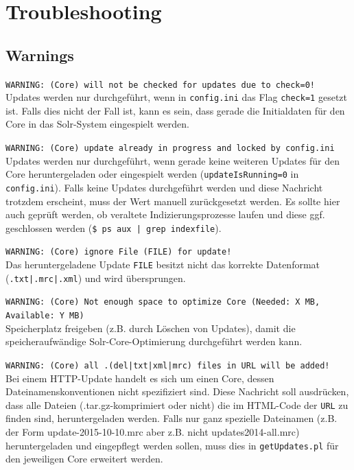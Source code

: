 \documentclass[10pt]{article}
\begin{document}
\newpage
\section{Troubleshooting}
\subsection{Warnings}
\texttt{WARNING: (Core) will not be checked for updates due to check=0!}\\
Updates werden nur durchgeführt, wenn in \texttt{config.ini} das Flag \texttt{check=1} gesetzt ist. Falls dies nicht der Fall ist, kann es sein, dass gerade die Initialdaten für den Core in das Solr-System eingespielt werden. 

\texttt{WARNING: (Core) update already in progress and locked by config.ini}\\
Updates werden nur durchgeführt, wenn gerade keine weiteren Updates für den Core heruntergeladen oder eingespielt werden (\texttt{updateIsRunning=0} in \texttt{config.ini}). Falls keine Updates durchgeführt werden und diese Nachricht trotzdem erscheint, muss der Wert manuell zurückgesetzt werden. Es sollte hier auch geprüft werden, ob veraltete Indizierungsprozesse laufen und diese ggf. geschlossen werden (\texttt{\$ ps aux | grep indexfile}).

\texttt{WARNING: (Core) ignore File (FILE) for update!}\\
Das heruntergeladene Update \texttt{FILE} besitzt nicht das korrekte Datenformat (\texttt{.txt|.mrc|.xml}) und wird übersprungen.
 
\texttt{WARNING: (Core) Not enough space to optimize Core (Needed: X MB, Available: Y MB)} \\
Speicherplatz freigeben (z.B. durch Löschen von Updates), damit die speicheraufwändige Solr-Core-Optimierung durchgeführt werden kann.

\texttt{WARNING: (Core) all .(del|txt|xml|mrc) files in URL will be added!} \\ 
Bei einem HTTP-Update handelt es sich um einen Core, dessen Dateinamenskonventionen nicht spezifiziert sind. Diese Nachricht soll ausdrücken, dass alle Dateien (.tar.gz-komprimiert oder nicht) die im HTML-Code der \texttt{URL} zu finden sind, heruntergeladen werden. Falls nur ganz spezielle Dateinamen (z.B. der Form update-2015-10-10.mrc aber z.B. nicht updates2014-all.mrc) heruntergeladen und eingepflegt werden sollen, muss dies in \texttt{getUpdates.pl} für den jeweiligen Core erweitert werden.
\end{document}
